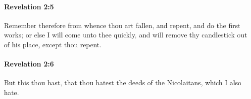 		\paragraph{Revelation 2:5} %
			\label{REVELATIONNT-2-5}

			Remember therefore from whence thou art fallen, and repent, and do the first works; or else I will come unto thee quickly, and will remove thy candlestick out of his place, except thou repent.

			\begin{framed}
			\scriptsize
				\begin{compactdesc}
					\item[SBLG] 
				\end{compactdesc}
			\end{framed}

		\paragraph{Revelation 2:6} %
			\label{REVELATIONNT-2-6}

			But this thou hast, that thou hatest the deeds of the Nicolaitans, which I also hate.

